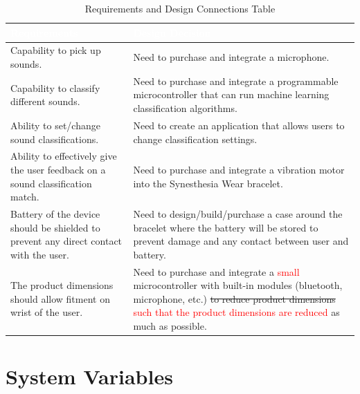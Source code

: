 \documentclass[12pt, titlepage]{article}
\begin{document}
\begin{table}[H]
  \centering
  \label{table:Connections Table} 
  \begin{tabular}{|p{7cm}|p{7cm}|} 
  \hline
  \rowcolor[rgb]{0.071,0.49,0.698} \textcolor{white}{Requirements} & \textcolor{white}{Design Decision}                                          \\ 
  \hline
  \rowcolor[rgb]{0.675,0.827,0.902} Capability to pick up sounds.              & Need to purchase and integrate a microphone.\\
  \hline
  \rowcolor[rgb]{0.675,0.827,0.902} Capability to classify different sounds.              & Need to purchase and integrate a programmable microcontroller that can run machine learning classification algorithms.\\
  \hline
  \rowcolor[rgb]{0.675,0.827,0.902} Ability to set/change sound classifications.            & Need to create an application that allows users to change classification settings.\\    
  \hline
  \rowcolor[rgb]{0.675,0.827,0.902} Ability to effectively give the user feedback on a sound classification match.           & Need to purchase and integrate a vibration motor into the Synesthesia Wear bracelet.\\
  \hline
  \rowcolor[rgb]{0.675,0.827,0.902} Battery of the device should be shielded to prevent any direct contact with the user.           & Need to design/build/purchase a case around the bracelet where the battery will be stored to prevent damage and any contact between user and battery.\\
  \hline
  \rowcolor[rgb]{0.675,0.827,0.902} The product dimensions should allow fitment on wrist of the user.           & Need to purchase and integrate a \textcolor{red}{small} microcontroller with built-in modules (bluetooth, microphone, etc.) \sout{to reduce product dimensions} \textcolor{red}{such that the product dimensions are reduced} as much as possible.\\
  \hline
  \end{tabular}
  \caption{Requirements and Design Connections Table}
\end{table}

\section{System Variables}
\end{document}
